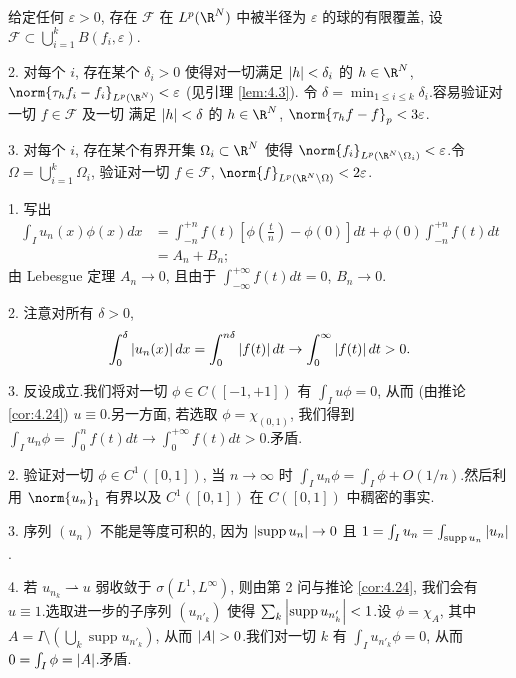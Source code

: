 
给定任何 $\varepsilon>0$, 存在 $\mathcal{F}$ 在 $L^p(\R^N)$ 中被半径为
$\varepsilon$ 的球的有限覆盖, 设 $\mathcal{F}\subset\bigcup_{i=1}^kB(f_i,\varepsilon)$.

2. 对每个 $i$, 存在某个 $\delta_i>0$ 使得对一切满足 $\left|h\right|<\delta_i$ 的
$h\in\R^N$, $\norm{\tau_hf_i-f_i}_{L^p(\R^N)}<\varepsilon$ (见引理  \ref{lem:4.3}).
令 $\delta=\min_{1\le i\le k}\delta_i$.容易验证对一切 $f\in\mathcal{F}$ 及一切
满足 $\left|h\right|<\delta$ 的 $h\in\R^N$, $\norm{\tau_hf-f}_p<3\varepsilon$.

3. 对每个 $i$, 存在某个有界开集 $\Omega_i\subset\R^N$ 使得
$\norm{f_i}_{L^p(\R^N\setminus\Omega_i)}<\varepsilon$.令
$\Omega=\bigcup_{i=1}^k\Omega_i$, 验证对一切 $f\in\mathcal{F}$,
$\norm{f}_{L^p(\R^N\setminus\Omega)}<2\varepsilon$.


1. 写出
\begin{align*}
\int_I u_n(x)\phi(x)dx&=\int_{-n}^{+n}f(t)\left[\phi\left(\frac{t}{n}\right)-\phi(0)\right]dt
+\phi(0)\int_{-n}^{+n}f(t)dt\\
&=A_n+B_n;
\end{align*}
由 Lebesgue 定理 $A_n\to0$, 且由于 $\int_{-\infty}^{+\infty}f(t)dt=0$,
$B_n\to0$.

2. 注意对所有 $\delta>0$,
\begin{equation*}
\int_0^\delta\left|u_n(x)\right|dx=\int_0^{n\delta}\left|f(t)\right|dt\to\int_0^\infty\left|f(t)\right|dt>0.
\end{equation*}

3. 反设成立.我们将对一切 $\phi\in C([-1,+1])$ 有 $\int_I u\phi=0$, 从而
(由推论  \ref{cor:4.24}) $u\equiv0$.另一方面, 若选取 $\phi=\chi_{(0,1)}$,
我们得到 $\int_I u_n\phi=\int_0^nf(t)dt\to\int_0^{+\infty}f(t)dt>0$.矛盾.


2. 验证对一切 $\phi\in C^1([0,1])$, 当 $n\to\infty$ 时
$\int_I u_n\phi=\int_I\phi+O(1/n)$.然后利用 $\norm{u_n}_1$ 有界以及
$C^1([0,1])$ 在 $C([0,1])$ 中稠密的事实.

3. 序列 $(u_n)$ 不能是等度可积的, 因为 $\left|\operatorname{supp}u_n\right|\to0$ 且
$1=\int_I u_n=\int_{\operatorname{supp}u_n}\left|u_n\right|$.

4. 若 $u_{n_k}\rightharpoonup u$ 弱收敛于 $\sigma(L^1,L^\infty)$, 则由第
2 问与推论  \ref{cor:4.24}, 我们会有 $u\equiv1$.选取进一步的子序列 $(u_{n'_k})$
使得 $\sum_k\left|\operatorname{supp}u_{n'_k}\right|<1$.设 $\phi=\chi_A$, 其中
$A=I\setminus\left(\bigcup_k\operatorname{supp}u_{n'_k}\right)$, 从而
$\abs{A}>0$.我们对一切 $k$ 有 $\int_I u_{n'_k}\phi=0$, 从而
$0=\int_I\phi=\left|A\right|$.矛盾.

